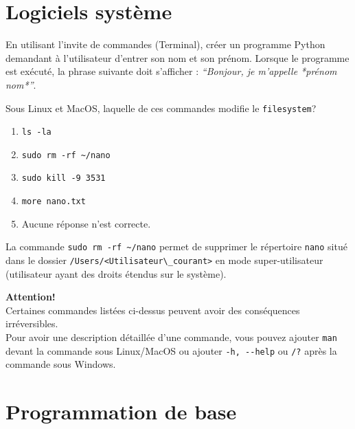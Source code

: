 \section{Logiciels système}

\begin{Exercice}[10 minutes]
    En utilisant l’invite de commandes (Terminal), créer un programme Python demandant à l’utilisateur d’entrer son nom et son prénom. Lorsque le programme est exécuté, la phrase suivante doit s’afficher : \textit{``Bonjour, je m’appelle *prénom nom*''}.
\end{Exercice}

\begin{solution}
    
\end{solution}


\begin{Exercice}[5 minutes]
    Sous Linux et MacOS, laquelle de ces commandes modifie le \lstinline{filesystem}?
    \begin{enumerate}
        \item \lstinline{ls -la}
        \item \lstinline{sudo rm -rf ~/nano}
        \item \lstinline{sudo kill -9 3531}
        \item \lstinline{more nano.txt}
        \item Aucune réponse n'est correcte.
    \end{enumerate}
    \begin{solution}
        La commande \lstinline{sudo rm -rf ~/nano} permet de supprimer le répertoire \lstinline{nano} situé dans le dossier \lstinline{/Users/<Utilisateur\_courant>} en mode super-utilisateur (utilisateur ayant des droits étendus sur le système).
    \end{solution}
    \begin{conseil}
        \textbf{Attention!}\\
        Certaines commandes listées ci-dessus peuvent avoir des conséquences irréversibles.\\
        Pour avoir une description détaillée d'une commande, vous pouvez ajouter \lstinline{man} devant la commande sous Linux/MacOS ou ajouter \lstinline{-h, --help} ou \lstinline{/?} après la commande sous Windows.
    \end{conseil}
\end{Exercice}

\section{Programmation de base}


